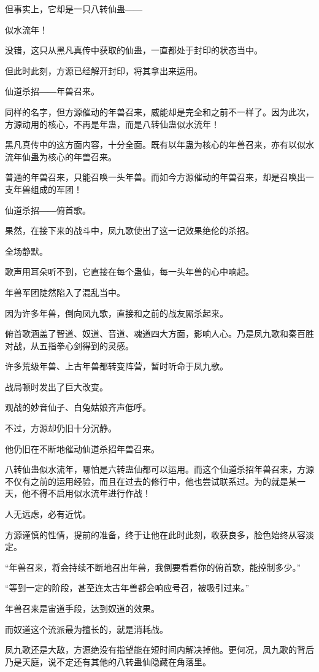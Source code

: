 \begin{this_body}
但事实上，它却是一只八转仙蛊――

似水流年！

没错，这只从黑凡真传中获取的仙蛊，一直都处于封印的状态当中。

但此时此刻，方源已经解开封印，将其拿出来运用。

仙道杀招――年兽召来。

同样的名字，但方源催动的年兽召来，威能却是完全和之前不一样了。因为此次，方源动用的核心，不再是年蛊，而是八转仙蛊似水流年！

黑凡真传中的这方面内容，十分全面。既有以年蛊为核心的年兽召来，亦有以似水流年仙蛊为核心的年兽召来。

普通的年兽召来，只能召唤一头年兽。而如今方源催动的年兽召来，却是召唤出一支年兽组成的军团！

仙道杀招――俯首歌。

果然，在接下来的战斗中，凤九歌使出了这一记效果绝伦的杀招。

全场静默。

歌声用耳朵听不到，它直接在每个蛊仙，每一头年兽的心中响起。

年兽军团陡然陷入了混乱当中。

因为许多年兽，倒向凤九歌，直接和之前的战友厮杀起来。

俯首歌涵盖了智道、奴道、音道、魂道四大方面，影响人心。乃是凤九歌和秦百胜对战，从五指拳心剑得到的灵感。

许多荒级年兽、上古年兽都转变阵营，暂时听命于凤九歌。

战局顿时发出了巨大改变。

观战的妙音仙子、白兔姑娘齐声低呼。

不过，方源却仍旧十分沉静。

他仍旧在不断地催动仙道杀招年兽召来。

八转仙蛊似水流年，哪怕是六转蛊仙都可以运用。而这个仙道杀招年兽召来，方源不仅有之前的运用经验，而且在过去的修行中，他也尝试联系过。为的就是某一天，他不得不启用似水流年进行作战！

人无远虑，必有近忧。

方源谨慎的性情，提前的准备，终于让他在此时此刻，收获良多，脸色始终从容淡定。

“年兽召来，将会持续不断地召出年兽，我倒要看看你的俯首歌，能控制多少。”

“等到一定的阶段，甚至连太古年兽都会响应号召，被吸引过来。”

年兽召来是宙道手段，达到奴道的效果。

而奴道这个流派最为擅长的，就是消耗战。

凤九歌还是大敌，方源绝没有指望能在短时间内解决掉他。更何况，凤九歌的背后乃是天庭，说不定还有其他的八转蛊仙隐藏在角落里。


\end{this_body}
